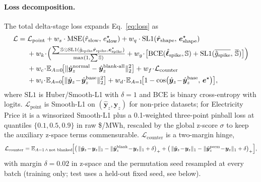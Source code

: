 \documentclass{article}
\begin{document}
\paragraph{Loss decomposition.}
The total delta-stage loss expands Eq.~\ref{eq:loss} as
\begin{equation}
\begin{aligned}
\mathcal{L} =\;& \mathcal{L}_{\text{point}}
+ w_s\cdot\mathrm{MSE}(\hat r_{\text{slow}},\,e^{\star}_{\text{slow}})
+ w_q\cdot\mathrm{SL1}(\hat{\bm{r}}_{\text{shape}},\,\bm{e}^{\star}_{\text{shape}})\\
&+ w_k\!\cdot\!\Bigl(\tfrac{\sum \mathbb{S}\odot\mathrm{SL1}(\hat g_{\text{spike}}\hat{\bm{r}}_{\text{spike}},\bm{e}^{\star}_{\text{spike}})}{\max(1,\sum \mathbb{S})}
+ w_g\!\cdot\!\bigl[\mathrm{BCE}(\hat{\bm{\ell}}_{\text{spike}},\mathbb{S})
+\mathrm{SL1}(\overline{\hat g_{\text{spike}}},\,\overline{\mathbb{S}})\bigr]\Bigr)\\
&+ w_c\!\cdot\!\mathbb{E}_{A=0}\!\bigl[\|\hat{\bm{y}}_z^{\text{normal}}-\hat{\bm{y}}_z^{\text{blank-all}}\|_2^2\bigr]
+ w_f\!\cdot\!\mathcal{L}_{\text{counter}}\\
&+ w_i\!\cdot\!\mathbb{E}_{A=0}\!\bigl[\|\hat{\bm{y}}_z\!-\!\hat{\bm{y}}_z^{\text{base}}\|_2^2\bigr]
+ w_d\!\cdot\!\mathbb{E}_{A=1}\!\bigl[1-\cos(\hat{\bm{y}}_z\!-\!\hat{\bm{y}}_z^{\text{base}},\,\bm{e}^{\star})\bigr],
\end{aligned}
\label{eq:loss_full}
\end{equation}
where $\mathrm{SL1}$ is Huber/Smooth-L1 with $\delta{=}1$ and $\mathrm{BCE}$ is binary cross-entropy with logits.
$\mathcal{L}_{\text{point}}$ is Smooth-L1 on $(\hat{\bm{y}}_z,\bm{y}_z)$ for non-price datasets; for Electricity Price it is a winsorized Smooth-L1 plus a 0.1-weighted three-point pinball loss at quantiles $\{0.1,0.5,0.9\}$ in raw \$/MWh, rescaled by the global z-score $\sigma$ to keep the auxiliary z-space terms commensurable.
$\mathcal{L}_{\text{counter}}$ is a two-margin hinge,
\begin{equation}
\mathcal{L}_{\text{counter}} = \mathbb{E}_{A=1\,\wedge\,\text{not blanked}}\!\Bigl[
\bigl(\,\|\hat{\bm{y}}_z\!-\!\bm{y}_z\|_1 - \|\hat{\bm{y}}_z^{\text{blank}}\!-\!\bm{y}_z\|_1 + \delta\bigr)_+ +
\bigl(\,\|\hat{\bm{y}}_z\!-\!\bm{y}_z\|_1 - \|\hat{\bm{y}}_z^{\text{perm}}\!-\!\bm{y}_z\|_1 + \delta\bigr)_+
\Bigr],
\end{equation}
with margin $\delta{=}0.02$ in z-space and the permutation seed resampled at every batch (training only; test uses a held-out fixed seed, see below).
\end{document}
